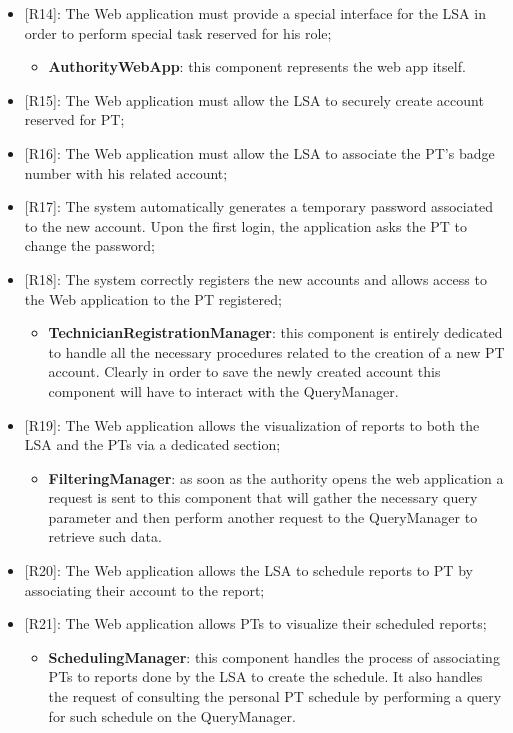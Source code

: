 \begin{itemize}
\begin{itemize}
    \end{itemize}     
    \item {[R14]}: The Web application must provide a special interface for the LSA in order to perform special task reserved for his role;
    \begin{itemize}
      \item \textbf{AuthorityWebApp}: this component represents the web app itself.
    \end{itemize}  
    \item {[R15]}: The Web application must allow the LSA to securely create account reserved for PT;  
    \item[] {[R16]}: The Web application must allow the LSA to associate the PT's badge number with his related account;
    \item[] {[R17]}: The system automatically generates a temporary password associated to the new account. Upon the first login, the application asks the PT to change the password;
    \item[] {[R18]}: The system correctly registers the new accounts and allows access to the Web application to the PT registered;
    \begin{itemize}
      \item \textbf{TechnicianRegistrationManager}: this component is entirely dedicated to handle all the necessary procedures related to the creation of a new PT account. Clearly in order to save the newly created account this component will have to interact with the QueryManager.
    \end{itemize} 
    \item {[R19]}: The Web application allows the visualization of reports to both the LSA and the PTs via a dedicated section;
    \begin{itemize}
      \item \textbf{FilteringManager}: as soon as the authority opens the web application a request is sent to this component that will gather the necessary query parameter and then perform another request to the QueryManager to retrieve such data.
    \end{itemize}    
    \item {[R20]}: The Web application allows the LSA to schedule reports to PT by associating their account to the report;
    \item[] {[R21]}: The Web application allows PTs to visualize their scheduled reports;
    \begin{itemize}
      \item \textbf{SchedulingManager}: this component handles the process of associating PTs to reports done by the LSA to create the schedule. It also handles the request of consulting the personal PT schedule by performing a query for such schedule on the QueryManager.

\end{itemize}
\end{itemize}
